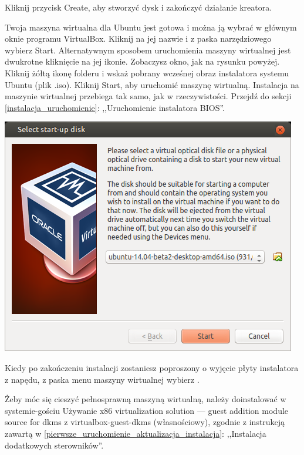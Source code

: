 Kliknij przycisk \textcolor{ubuntu_orange}{Create}, aby stworzyć dysk i zakończyć działanie kreatora.

Twoja maszyna wirtualna dla Ubuntu jest gotowa i można ją wybrać w głównym oknie programu VirtualBox. Kliknij na jej nazwie i z paska narzędziowego wybierz \textcolor{ubuntu_orange}{Start}. Alternatywnym sposobem uruchomienia maszyny wirtualnej jest dwukrotne kliknięcie na jej ikonie. Zobaczysz okno, jak na rysunku powyżej. Kliknij żółtą ikonę folderu i wskaż pobrany wcześnej obraz instalatora systemu Ubuntu (plik .iso). Kliknij \textcolor{ubuntu_orange}{Start}, aby uruchomić maszynę wirtualną. Instalacja na maszynie wirtualnej przebiega tak samo, jak w rzeczywistości. Przejdź do sekcji \ref{instalacja_uruchomienie}: ,,Uruchomienie instalatora BIOS''.

\begin{center}
	\includegraphics[width=\linewidth]{images/virtualbox_start.png}
\end{center}

Kiedy po zakończeniu instalacji zostaniesz poproszony o wyjęcie płyty instalatora z napędu, z paska menu maszyny wirtualnej wybierz .

Żeby móc się cieszyć pełnosprawną maszyną wirtualną, należy doinstalować w systemie-gościu \textcolor{ubuntu_orange}{Używanie x86 virtualization solution --- guest addition module source for dkms z virtualbox-guest-dkms (własnościowy)}, zgodnie z instrukcją zawartą w \ref{pierwsze_uruchomienie_aktualizacja_instalacja}: ,,Instalacja dodatkowych sterowników''.
